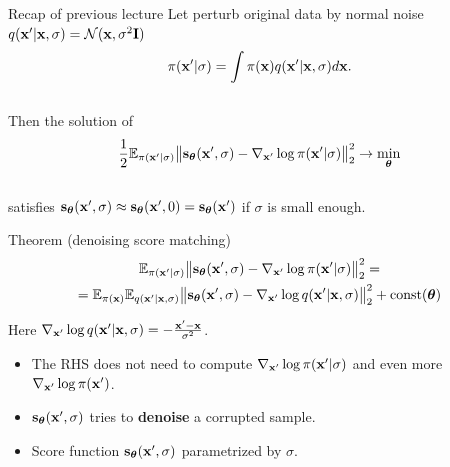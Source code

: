 \begin{frame}{Recap of previous lecture}
	Let perturb original data by normal noise $q(\mathbf{x}' | \mathbf{x}, \sigma) = \mathcal{N}(\mathbf{x}, \sigma^2 \mathbf{I})$
	\vspace{-0.3cm}
	\[
	\pi(\mathbf{x}' | \sigma) = \int \pi(\mathbf{x}) q(\mathbf{x}' | \mathbf{x}, \sigma) d\mathbf{x}.
	\]
	\vspace{-0.6cm} \\
	Then the solution of 
	\vspace{-0.2cm}
	\[
	\frac{1}{2} \mathbb{E}_{\pi(\mathbf{x}' | \sigma)}\bigl\| \mathbf{s}_{\boldsymbol{\theta}}(\mathbf{x}', \sigma) - \nabla_{\mathbf{x}'} \log \pi(\mathbf{x}' | \sigma) \bigr\|^2_2 \rightarrow \min_{\boldsymbol{\theta}}
	\]
	\vspace{-0.5cm} \\
	satisfies $\mathbf{s}_{\boldsymbol{\theta}}(\mathbf{x}', \sigma) \approx \mathbf{s}_{\boldsymbol{\theta}}(\mathbf{x}', 0) = \mathbf{s}_{\boldsymbol{\theta}}(\mathbf{x}')$ if $\sigma$ is small enough.
	\begin{block}{Theorem (denoising score matching)}
		\vspace{-0.8cm}
		\begin{multline*}
			\mathbb{E}_{\pi(\mathbf{x}' | \sigma)}\bigl\| \mathbf{s}_{\boldsymbol{\theta}}(\mathbf{x}', \sigma) - \nabla_{\mathbf{x}'} \log \pi(\mathbf{x}' | \sigma) \bigr\|^2_2 = \\ = \mathbb{E}_{\pi(\mathbf{x})} \mathbb{E}_{q(\mathbf{x}' | \mathbf{x}, \sigma)}\bigl\| \mathbf{s}_{\boldsymbol{\theta}}(\mathbf{x}', \sigma) - \nabla_{\mathbf{x}'} \log q(\mathbf{x}' | \mathbf{x}, \sigma) \bigr\|^2_2 + \text{const}(\boldsymbol{\theta})
		\end{multline*}
		\vspace{-0.8cm}
	\end{block}
	Here $\nabla_{\mathbf{x}'} \log q(\mathbf{x}' | \mathbf{x}, \sigma) = - \frac{\mathbf{x}' - \mathbf{x}}{\sigma^2}$.
	\begin{itemize}
		\item The RHS does not need to compute $\nabla_{\mathbf{x}'} \log \pi(\mathbf{x}' | \sigma)$ and even more $\nabla_{\mathbf{x}'} \log \pi(\mathbf{x}')$.
		\item $\mathbf{s}_{\boldsymbol{\theta}}(\mathbf{x}', \sigma)$ tries to \textbf{denoise} a corrupted sample.
		\item Score function $\mathbf{s}_{\boldsymbol{\theta}}(\mathbf{x}', \sigma)$ parametrized by $\sigma$. 
	\end{itemize}
\end{frame}
